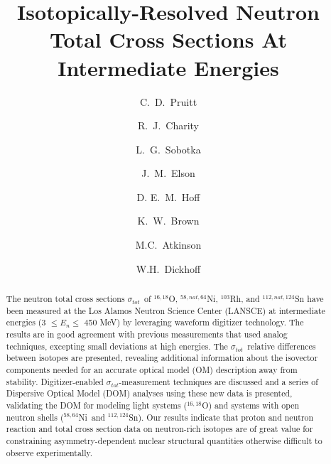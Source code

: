 \documentclass[twocolumn,secnumarabic,amssymb, nobibnotes, aps, prl,
superscriptaddress, nobalancelastpage, draft]{revtex4}
\newcommand{\tot}{\ensuremath{\sigma_{tot}}}
\newcommand{\oSixEight}{\ensuremath{^{16,18}}O}
\newcommand{\niEightFour}{\ensuremath{^{58,64}}N\lowercase{i}}
\newcommand{\snTwelveFour}{\ensuremath{^{112,124}}S\lowercase{n}}
\begin{document}
\begin{abstract}
    The neutron total cross sections \tot\ of $^{16,18}$O,
    $^{58,nat,64}$Ni, $^{103}$Rh, and $^{112,nat,124}$Sn have been measured at the Los Alamos
    Neutron Science Center (LANSCE) at intermediate energies (3 $\leq E_{n}
    \leq$ 450 MeV) by
    leveraging waveform digitizer technology. The results are in good agreement
    with previous measurements that used analog techniques,
    excepting small deviations at high energies.
    The \tot\ relative differences between isotopes are presented,
    revealing additional information about
    the isovector components needed for an accurate optical model (OM)
    description away from stability. Digitizer-enabled \tot-measurement
    techniques are discussed and a series of Dispersive Optical Model (DOM)
    analyses using these new data is presented, validating the DOM for modeling light
    systems (\oSixEight) and systems with open neutron shells (\niEightFour\ and \snTwelveFour).
    Our results indicate that proton and neutron reaction and total cross
    section data on neutron-rich isotopes are of great value for constraining
    asymmetry-dependent nuclear structural quantities otherwise difficult
    to observe experimentally.
\end{abstract}

\title{Isotopically-Resolved Neutron Total Cross Sections At
Intermediate Energies}

\author{C.~D.~Pruitt}  
\author{R.~J.~Charity}
\author{L.~G.~Sobotka}
\author{J.~M.~Elson}
\author{D. E.~M.~Hoff}  
\author{K.~W.~Brown}
\author{M.C.~Atkinson}
\author{W.H.~Dickhoff}
\end{document}
